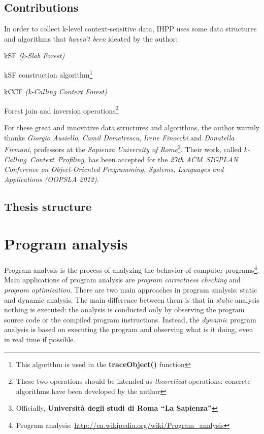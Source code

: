 \documentclass[a4paper,11pt]{report}
\begin{document}
\section{Contributions}

In order to collect k-level context-sensitive data, IHPP uses some data structures and algorithms that \emph{haven't been} ideated by the author:
\begin{itemize*}
\item kSF \emph{(k-Slab Forest)}
\item kSF construction algorithm\footnote{This algorithm is used in the \textbf{traceObject()} function}
\item kCCF \emph{(k-Calling Context Forest)}
\item Forest join and inversion operations\footnote{These two operations should be intended as \emph{theoretical} operations: concrete algorithms have been developed by the author}
\end{itemize*}

For these great and innovative data structures and algorithms, the author warmly thanks \emph{Giorgio Ausiello}, \emph{Camil Demetrescu}, \emph{Irene Finocchi} and \emph{Donatella Firmani}, professors at the \emph{Sapienza University of Rome}\footnote{Officially, \textbf{Universit\`a degli studi di Roma ``La Sapienza''}}. Their work, called \emph{\mbox{k-Calling Context Profiling}}, has been accepted for the \emph{27th \mbox{ACM SIGPLAN} Conference on Object-Oriented Programming, Systems, Languages and Applications (OOPSLA 2012)}.

\section{Thesis structure}

\chapter{Program analysis}


Program analysis is the process of analyzing the behavior of computer programs\footnote{Program analysis: \url{http://en.wikipedia.org/wiki/Program_analysis}}. Main applications of program analysis are \emph{program correctness checking} and \emph{program optimization}.
There are two main approaches in program analysis: static and dynamic analysis.
The main difference between them is that in \emph{static} analysis nothing is executed: the analysis
is conducted only by observing the program source code or the compiled program instructions. Instead, the \emph{dynamic} program analysis is based on executing the program and observing what is it doing, even in real time if possible.
\end{document}
